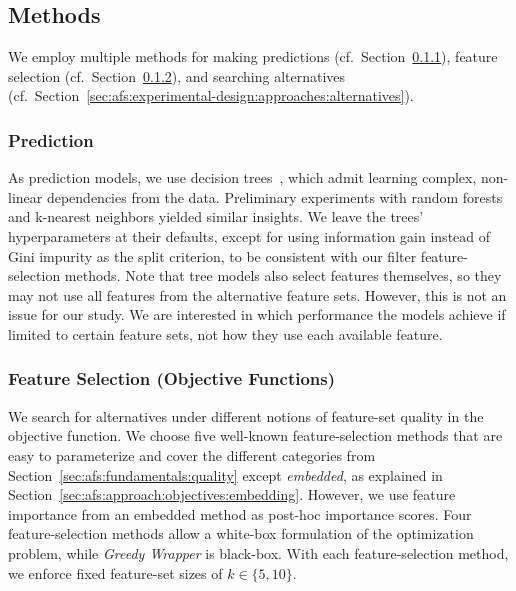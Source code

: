 \documentclass{article}
\theoremstyle{definition}
\begin{document}
\subsection{Methods}
\label{sec:afs:experimental-design:approaches}

We employ multiple methods for making predictions (cf.~Section~\ref{sec:afs:experimental-design:approaches:prediction}), feature selection (cf.~Section~\ref{sec:afs:experimental-design:approaches:feature-selection}), and searching alternatives (cf.~Section~\ref{sec:afs:experimental-design:approaches:alternatives}).

\subsubsection{Prediction}
\label{sec:afs:experimental-design:approaches:prediction}

As prediction models, we use decision trees~\cite{breiman1984classification}, which admit learning complex, non-linear dependencies from the data.
Preliminary experiments with random forests~\cite{breiman2001random} and k-nearest neighbors yielded similar insights.
We leave the trees' hyperparameters at their defaults, except for using information gain instead of Gini impurity as the split criterion, to be consistent with our filter feature-selection methods.
Note that tree models also select features themselves, so they may not use all features from the alternative feature sets.
However, this is not an issue for our study.
We are interested in which performance the models achieve if limited to certain feature sets, not how they use each available feature.

\subsubsection{Feature Selection (Objective Functions)}
\label{sec:afs:experimental-design:approaches:feature-selection}

We search for alternatives under different notions of feature-set quality in the objective function.
We choose five well-known feature-selection methods that are easy to parameterize and cover the different categories from Section~\ref{sec:afs:fundamentals:quality} except \emph{embedded}, as explained in Section~\ref{sec:afs:approach:objectives:embedding}.
However, we use feature importance from an embedded method as post-hoc importance scores.
Four feature-selection methods allow a white-box formulation of the optimization problem, while \emph{Greedy Wrapper} is black-box.
With each feature-selection method, we enforce fixed feature-set sizes of $k \in \{5,10\}$.
\end{document}
